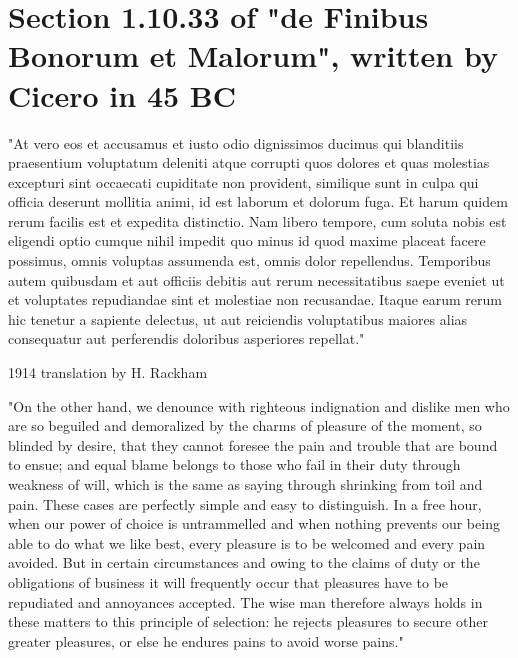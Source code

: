 \section{Section 1.10.33 of "de Finibus Bonorum et Malorum", written by Cicero
in 45 BC}

"At vero eos et accusamus et iusto odio dignissimos ducimus qui blanditiis
praesentium voluptatum deleniti atque corrupti quos dolores et quas molestias
excepturi sint occaecati cupiditate non provident, similique sunt in culpa qui
officia deserunt mollitia animi, id est laborum et dolorum fuga. Et harum
quidem rerum facilis est et expedita distinctio. Nam libero tempore, cum
soluta nobis est eligendi optio cumque nihil impedit quo minus id quod maxime
placeat facere possimus, omnis voluptas assumenda est, omnis dolor
repellendus. Temporibus autem quibusdam et aut officiis debitis aut rerum
necessitatibus saepe eveniet ut et voluptates repudiandae sint et molestiae
non recusandae. Itaque earum rerum hic tenetur a sapiente delectus, ut aut
reiciendis voluptatibus maiores alias consequatur aut perferendis doloribus
asperiores repellat."

1914 translation by H. Rackham

"On the other hand, we denounce with righteous indignation and dislike men who
are so beguiled and demoralized by the charms of pleasure of the moment, so
blinded by desire, that they cannot foresee the pain and trouble that are
bound to ensue; and equal blame belongs to those who fail in their duty
through weakness of will, which is the same as saying through shrinking from
toil and pain. These cases are perfectly simple and easy to distinguish. In a
free hour, when our power of choice is untrammelled and when nothing prevents
our being able to do what we like best, every pleasure is to be welcomed and
every pain avoided. But in certain circumstances and owing to the claims of
duty or the obligations of business it will frequently occur that pleasures
have to be repudiated and annoyances accepted. The wise man therefore always
holds in these matters to this principle of selection: he rejects pleasures to
secure other greater pleasures, or else he endures pains to avoid worse
pains." 

